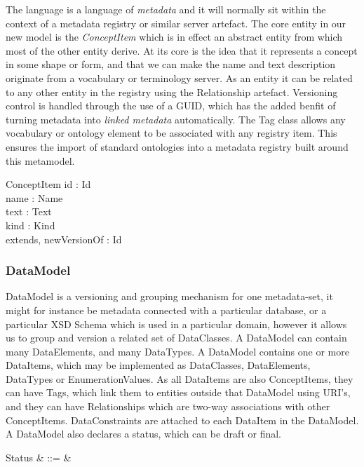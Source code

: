 \documentclass{llncs}
\def\draft{\mathsf{draft}}
\def\final{\mathsf{final}}
\begin{document}
The language is a language of \emph{metadata} and it will normally sit within the context of a metadata registry or similar server artefact. The core entity in our new model is the \emph{ConceptItem} which is in effect an abstract entity from which most of the other entity derive. At its core is the idea that it represents a concept in some shape or form, and that we can make the name and text description originate from a vocabulary or terminology server. As an entity it can be related to any other entity in the registry using the Relationship artefact. Versioning control is handled through the use of a GUID, which has the added benfit of turning metadata into \emph{linked metadata} automatically. The Tag class allows any vocabulary or ontology element to be associated with any registry item. This ensures the import of standard ontologies into a metadata registry built around this metamodel.

\begin{schema}{ConceptItem}
  id : Id \\
  name : Name \\
  text : Text \\
  kind : Kind \\  
  extends, newVersionOf : \power Id
\end{schema}

\subsubsection{DataModel}

 DataModel is a versioning and grouping mechanism for one metadata-set, it might for instance be metadata connected with a particular database, or a particular XSD Schema which is used in a particular domain, however it allows us to group and version a related set of DataClasses.  A DataModel can contain many DataElements, and many DataTypes. A DataModel contains one or more DataItems, which may be implemented as DataClasses, DataElements, DataTypes or EnumerationValues. As all DataItems are also ConceptItems, they can have Tags, which link them to entities outside that DataModel using URI's, and they can have Relationships which are two-way associations with other ConceptItems. DataConstraints are attached to each DataItem in the DataModel. A DataModel also declares a status, which can be draft or final.

\begin{syntax}
  Status & ::= & \draft \mid \final 
\end{syntax}
\end{document}
